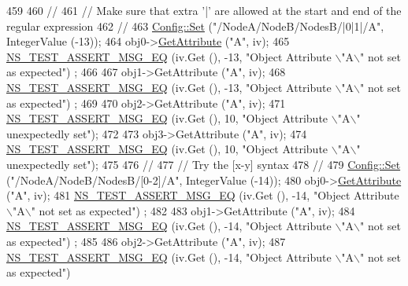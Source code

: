 \begin{DoxyCode}
459 
460   \textcolor{comment}{//}
461   \textcolor{comment}{// Make sure that extra '|' are allowed at the start and end of the regular expression}
462   \textcolor{comment}{//}
463   \hyperlink{group__config_gadce03667ec621d64ce4aace85d9bcfd0}{Config::Set} (\textcolor{stringliteral}{"/NodeA/NodeB/NodesB/|0|1|/A"}, IntegerValue (-13));
464   obj0->\hyperlink{classns3_1_1ObjectBase_a895d1de2f96063d0e0fd78463e7a7e30}{GetAttribute} (\textcolor{stringliteral}{"A"}, iv);
465   \hyperlink{group__testing_ga2a9d78cffb3db8e867c35fff0b698cf5}{NS\_TEST\_ASSERT\_MSG\_EQ} (iv.Get (), -13, \textcolor{stringliteral}{"Object Attribute \(\backslash\)"A\(\backslash\)" not set as expected"})
      ;
466 
467   obj1->GetAttribute (\textcolor{stringliteral}{"A"}, iv);
468   \hyperlink{group__testing_ga2a9d78cffb3db8e867c35fff0b698cf5}{NS\_TEST\_ASSERT\_MSG\_EQ} (iv.Get (), -13, \textcolor{stringliteral}{"Object Attribute \(\backslash\)"A\(\backslash\)" not set as expected"})
      ;
469 
470   obj2->GetAttribute (\textcolor{stringliteral}{"A"}, iv);
471   \hyperlink{group__testing_ga2a9d78cffb3db8e867c35fff0b698cf5}{NS\_TEST\_ASSERT\_MSG\_EQ} (iv.Get (), 10, \textcolor{stringliteral}{"Object Attribute \(\backslash\)"A\(\backslash\)" unexpectedly set"});
472 
473   obj3->GetAttribute (\textcolor{stringliteral}{"A"}, iv);
474   \hyperlink{group__testing_ga2a9d78cffb3db8e867c35fff0b698cf5}{NS\_TEST\_ASSERT\_MSG\_EQ} (iv.Get (), 10, \textcolor{stringliteral}{"Object Attribute \(\backslash\)"A\(\backslash\)" unexpectedly set"});
475 
476   \textcolor{comment}{//}
477   \textcolor{comment}{// Try the [x-y] syntax}
478   \textcolor{comment}{//}
479   \hyperlink{group__config_gadce03667ec621d64ce4aace85d9bcfd0}{Config::Set} (\textcolor{stringliteral}{"/NodeA/NodeB/NodesB/[0-2]/A"}, IntegerValue (-14));
480   obj0->\hyperlink{classns3_1_1ObjectBase_a895d1de2f96063d0e0fd78463e7a7e30}{GetAttribute} (\textcolor{stringliteral}{"A"}, iv);
481   \hyperlink{group__testing_ga2a9d78cffb3db8e867c35fff0b698cf5}{NS\_TEST\_ASSERT\_MSG\_EQ} (iv.Get (), -14, \textcolor{stringliteral}{"Object Attribute \(\backslash\)"A\(\backslash\)" not set as expected"})
      ;
482 
483   obj1->GetAttribute (\textcolor{stringliteral}{"A"}, iv);
484   \hyperlink{group__testing_ga2a9d78cffb3db8e867c35fff0b698cf5}{NS\_TEST\_ASSERT\_MSG\_EQ} (iv.Get (), -14, \textcolor{stringliteral}{"Object Attribute \(\backslash\)"A\(\backslash\)" not set as expected"})
      ;
485 
486   obj2->GetAttribute (\textcolor{stringliteral}{"A"}, iv);
487   \hyperlink{group__testing_ga2a9d78cffb3db8e867c35fff0b698cf5}{NS\_TEST\_ASSERT\_MSG\_EQ} (iv.Get (), -14, \textcolor{stringliteral}{"Object Attribute \(\backslash\)"A\(\backslash\)" not set as expected"})

\end{DoxyCode}

